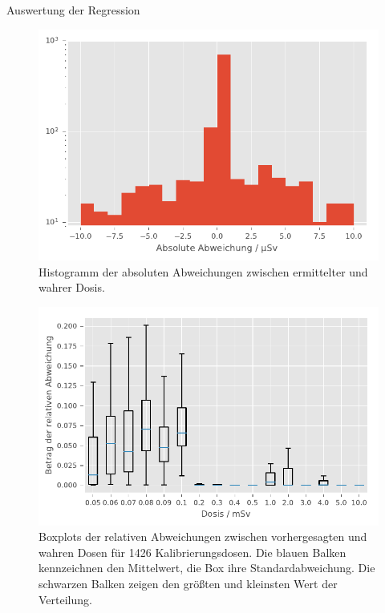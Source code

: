 \documentclass[20pt]{beamer}
\begin{document}
\begin{columns}[t, onlytextwidth]
\begin{column}{0.333\textwidth}
\begin{block}{Auswertung der Regression}
          \begin{figure}
              \includegraphics[width=\linewidth]{./python/absAbweichung.pdf}
              \caption{Histogramm der absoluten Abweichungen zwischen ermittelter und wahrer Dosis.}
              \label{absAbw}
          \end{figure}
          \begin{figure}
              \includegraphics[width=\linewidth]{./python/boxplot}
              \caption{Boxplots der relativen Abweichungen zwischen vorhergesagten und wahren Dosen für 1426 Kalibrierungsdosen. Die blauen Balken kennzeichnen den Mittelwert, die Box ihre Standardabweichung. 
              Die schwarzen Balken zeigen den größten und kleinsten Wert der Verteilung.
              }
              \label{boxplot}
          \end{figure}
      \end{block}%


    \end{column}%


  \end{columns}%
\end{document}

